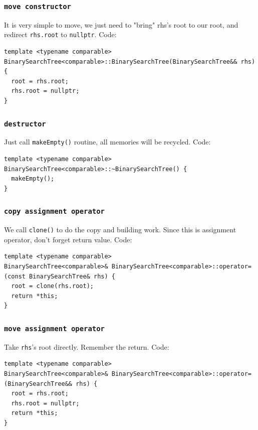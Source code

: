 \documentclass[12pt]{book}
\begin{document}
\subsubsection{\texttt{move constructor}}
\label{sec:org2bcc144}
It is very simple to move, we just need to "bring" rhs's root to our root, and redirect \texttt{rhs.root} to \texttt{nullptr}. Code:
\begin{verbatim}
template <typename comparable>
BinarySearchTree<comparable>::BinarySearchTree(BinarySearchTree&& rhs) {
  root = rhs.root;
  rhs.root = nullptr;
}
\end{verbatim}

\subsubsection{\texttt{destructor}}
\label{sec:orgf239813}
Just call \texttt{makeEmpty()} routine, all memories will be recycled. Code:
\begin{verbatim}
template <typename comparable>
BinarySearchTree<comparable>::~BinarySearchTree() {
  makeEmpty();
}
\end{verbatim}

\subsubsection{\texttt{copy assignment operator}}
\label{sec:org6e79723}
We call \texttt{clone()} to do the copy and building work. Since this is assignment operator, don't forget return value. Code:
\begin{verbatim}
template <typename comparable>
BinarySearchTree<comparable>& BinarySearchTree<comparable>::operator=(const BinarySearchTree& rhs) {
  root = clone(rhs.root);
  return *this;
}
\end{verbatim}

\subsubsection{\texttt{move assignment operator}}
\label{sec:orgf715a9a}
Take \texttt{rhs}'s root directly. Remember the return. Code:
\begin{verbatim}
template <typename comparable>
BinarySearchTree<comparable>& BinarySearchTree<comparable>::operator=(BinarySearchTree&& rhs) {
  root = rhs.root;
  rhs.root = nullptr;
  return *this;
}
\end{verbatim}
\end{document}
